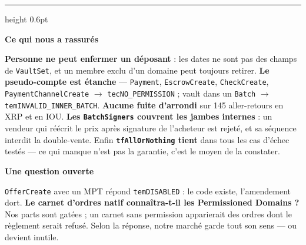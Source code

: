 \documentclass[10pt,a4paper]{article}
\newcommand{\tc}[1]{\texttt{#1}}
\begin{document}
\vspace{4pt}
{\color{rule}\hrule height 0.6pt}
\vspace{5pt}

\textbf{\color{accent}Ce qui nous a rassurés}\par
\textbf{Personne ne peut enfermer un déposant} : les dates ne sont pas des champs de
\tc{VaultSet}, et un membre exclu d'un domaine peut toujours retirer. \textbf{Le pseudo-compte
est étanche} --- \tc{Payment}, \tc{EscrowCreate}, \tc{CheckCreate}, \tc{PaymentChannelCreate}
$\rightarrow$ \tc{tecNO\_PERMISSION} ; vault dans un \tc{Batch} $\rightarrow$
\tc{temINVALID\_INNER\_BATCH}. \textbf{Aucune fuite d'arrondi} sur 145 aller-retours en XRP et
en IOU. \textbf{Les \tc{BatchSigners} couvrent les jambes internes} : un vendeur qui réécrit le
prix après signature de l'acheteur est rejeté, et sa séquence interdit la double-vente. Enfin
\textbf{\tc{tfAllOrNothing} tient} dans tous les cas d'échec testés --- ce qui manque n'est pas
la garantie, c'est le moyen de la constater.

\vspace{3pt}
\textbf{\color{accent}Une question ouverte}\par
\tc{OfferCreate} avec un MPT répond \tc{temDISABLED} : le code existe, l'amendement dort.
\textbf{Le carnet d'ordres natif connaîtra-t-il les Permissioned Domains ?} Nos parts sont
gatées ; un carnet sans permission apparierait des ordres dont le règlement serait refusé. Selon
la réponse, notre marché garde tout son sens --- ou devient inutile.
\end{document}
